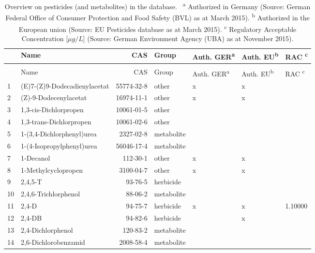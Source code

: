
\begin{longtable}{lp{3cm}rlp{1cm}p{1cm}p{1.5cm}}
\caption[Overview on pesticides in the database.]{Overview on pesticides (and metabolites) in the database. \
                    \textsuperscript{a} Authorized in Germany (Source: German Federal Office of Consumer Protection and Food Safety (BVL) as at March 2015). 
                    \textsuperscript{b} Authorized in the European union (Source: EU Pesticides database as at March 2015).
                    \textsuperscript{c} Regulatory Acceptable Concentration [$\mu g/L$] (Source: German Environment Agency (UBA) as at November 2015).} \\ 
  \toprule
 & Name & CAS & Group & Auth. GER\textsuperscript{a} & Auth. EU\textsuperscript{b} & RAC \textsuperscript{c} \\ 
  \midrule
  \endfirsthead
\caption*{\raggedright Table \thetable\ Continued. }\\
        \toprule
 & Name & CAS & Group & Auth. GER\textsuperscript{a} & Auth. EU\textsuperscript{b} & RAC \textsuperscript{c} \\ 
\midrule
\endhead
%
1 & (E)7-(Z)9-Dodecadienylacetat & 55774-32-8 & other & x & x &  \\ 
  2 & (Z)-9-Dodecenylacetat & 16974-11-1 & other & x & x &  \\ 
  3 & 1,3-cis-Dichlorpropen & 10061-01-5 & other &  &  &  \\ 
  4 & 1,3-trans-Dichlorpropen & 10061-02-6 & other &  &  &  \\ 
  5 & 1-(3,4-Dichlorphenyl)urea & 2327-02-8 & metabolite &  &  &  \\ 
  6 & 1-(4-Isopropylphenyl)urea & 56046-17-4 & metabolite &  &  &  \\ 
  7 & 1-Decanol & 112-30-1 & other & x & x &  \\ 
  8 & 1-Methylcyclopropen & 3100-04-7 & other & x & x &  \\ 
  9 & 2,4,5-T & 93-76-5 & herbicide &  &  &  \\ 
  10 & 2,4,6-Trichlorphenol & 88-06-2 & metabolite &  &  &  \\ 
  11 & 2,4-D & 94-75-7 & herbicide & x & x & 1.10000 \\ 
  12 & 2,4-DB & 94-82-6 & herbicide &  & x &  \\ 
  13 & 2,4-Dichlorphenol & 120-83-2 & metabolite &  &  &  \\ 
  14 & 2,6-Dichlorobenzamid & 2008-58-4 & metabolite &  &  &  \\ 

\end{longtable}
